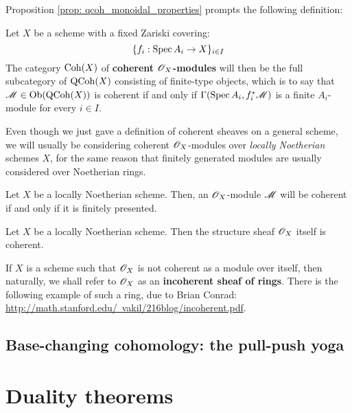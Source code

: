             Proposition \ref{prop: qcoh_monoidal_properties} prompts the following definition:
            \begin{definition} \label{def: coherent_modules}
                Let $X$ be a scheme with a fixed Zariski covering:
                    $$\{ f_i: \operatorname{Spec} A_i \to X \}_{i \in I}$$
                The category $\mathrm{Coh}(X)$ of \textbf{coherent $\mathscr{O}_X$-modules} will then be the full subcategory of $\mathrm{QCoh}(X)$ consisting of finite-type objects, which is to say that $\mathscr{M} \in \mathrm{Ob}( \mathrm{QCoh}(X) )$ is coherent if and only if $\Gamma(\operatorname{Spec} A_i, f_i^*\mathscr{M})$ is a finite $A_i$-module for every $i \in I$.
            \end{definition}
            Even though we just gave a definition of coherent sheaves on a general scheme, we will usually be considering coherent $\mathscr{O}_X$-modules over \textit{locally Noetherian} schemes $X$, for the same reason that finitely generated modules are usually considered over Noetherian rings. 
            \begin{proposition} \label{prop: coherent_modules_over_noetherian_schemes}
                Let $X$ be a locally Noetherian scheme. Then, an $\mathscr{O}_X$-module $\mathscr{M}$ will be coherent if and only if it is finitely presented.
            \end{proposition}
            \begin{example}
                Let $X$ be a locally Noetherian scheme. Then the structure sheaf $\mathscr{O}_X$ itself is coherent. 
            \end{example}
            \begin{example}
                If $X$ is a scheme such that $\mathscr{O}_X$ is not coherent as a module over itself, then naturally, we shall refer to $\mathscr{O}_X$ as an \textbf{incoherent sheaf of rings}. There is the following example of such a ring, due to Brian Conrad: \href{http://math.stanford.edu/~vakil/216blog/incoherent.pdf}{http://math.stanford.edu/~vakil/216blog/incoherent.pdf}.
            \end{example}

        \subsection{Base-changing cohomology: the pull-push yoga}

    \section{Duality theorems}
